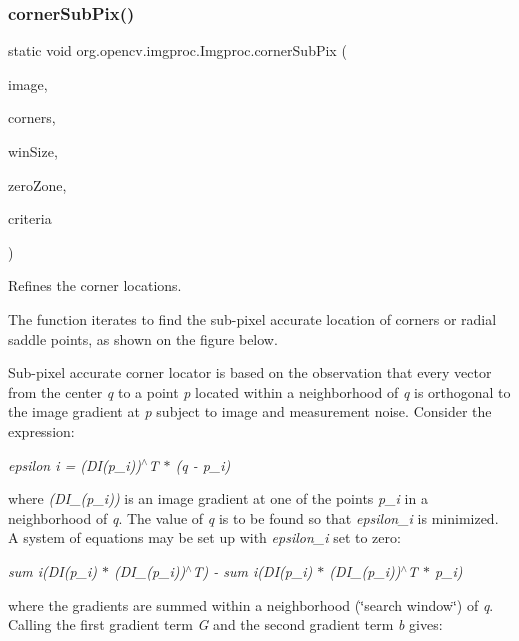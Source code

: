 \subsubsection{\texorpdfstring{corner\+Sub\+Pix()}{cornerSubPix()}}
{\footnotesize\ttfamily static void org.\+opencv.\+imgproc.\+Imgproc.\+corner\+Sub\+Pix (\begin{DoxyParamCaption}\item[{\mbox{\hyperlink{classorg_1_1opencv_1_1core_1_1_mat}{Mat}}}]{image,  }\item[{\mbox{\hyperlink{classorg_1_1opencv_1_1core_1_1_mat_of_point2f}{Mat\+Of\+Point2f}}}]{corners,  }\item[{\mbox{\hyperlink{classorg_1_1opencv_1_1core_1_1_size}{Size}}}]{win\+Size,  }\item[{\mbox{\hyperlink{classorg_1_1opencv_1_1core_1_1_size}{Size}}}]{zero\+Zone,  }\item[{\mbox{\hyperlink{classorg_1_1opencv_1_1core_1_1_term_criteria}{Term\+Criteria}}}]{criteria }\end{DoxyParamCaption})\hspace{0.3cm}{\ttfamily [static]}}

Refines the corner locations.

The function iterates to find the sub-\/pixel accurate location of corners or radial saddle points, as shown on the figure below.

Sub-\/pixel accurate corner locator is based on the observation that every vector from the center {\itshape q} to a point {\itshape p} located within a neighborhood of {\itshape q} is orthogonal to the image gradient at {\itshape p} subject to image and measurement noise. Consider the expression\+:

{\itshape epsilon {\itshape i = (DI}(p\+\_\+i))$^\wedge$T $\ast$ (q -\/ p\+\_\+i)}

where {\itshape (D\+I\+\_\+(p\+\_\+i))} is an image gradient at one of the points {\itshape p\+\_\+i} in a neighborhood of {\itshape q}. The value of {\itshape q} is to be found so that {\itshape epsilon\+\_\+i} is minimized. A system of equations may be set up with {\itshape epsilon\+\_\+i} set to zero\+:

{\itshape sum {\itshape i(DI}(p\+\_\+i) $\ast$ (D\+I\+\_\+(p\+\_\+i))$^\wedge$T) -\/ sum {\itshape i(DI}(p\+\_\+i) $\ast$ (D\+I\+\_\+(p\+\_\+i))$^\wedge$T $\ast$ p\+\_\+i)}

where the gradients are summed within a neighborhood (\char`\"{}search window\char`\"{}) of {\itshape q}. Calling the first gradient term {\itshape G} and the second gradient term {\itshape b} gives\+:

